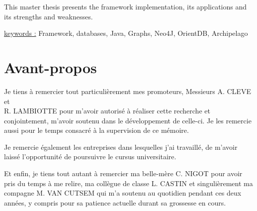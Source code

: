 \documentclass[a4paper,fleqn,12pt,oneside]{report}
\begin{document}
This master thesis presents the framework implementation, its applications and its strengths and weaknesses.

\quad \quad \underline{keywords :} Framework, databases, Java, Graphs, Neo4J, OrientDB, Archipelago

\chapter*{Avant-propos}

Je tiens à remercier tout particulièrement mes promoteurs, Messieurs A. CLEVE et \\R. LAMBIOTTE pour m'avoir autorisé à réaliser cette recherche et conjointement, m'avoir soutenu dans le développement de celle-ci. Je les remercie aussi pour le temps consacré à la supervision de ce mémoire. 

Je remercie également les entreprises dans lesquelles j'ai travaillé, de m'avoir laissé l'opportunité de poursuivre le cursus universitaire.

Et enfin, je tiens tout autant à remercier ma belle-mère C. NIGOT pour avoir pris du temps à me relire, ma collègue de classe L. CASTIN  et singulièrement ma compagne M. VAN CUTSEM qui m'a soutenu au quotidien pendant ces deux années, y compris pour sa patience actuelle durant sa grossesse en cours.


\tableofcontents
\newpage
\end{document}
